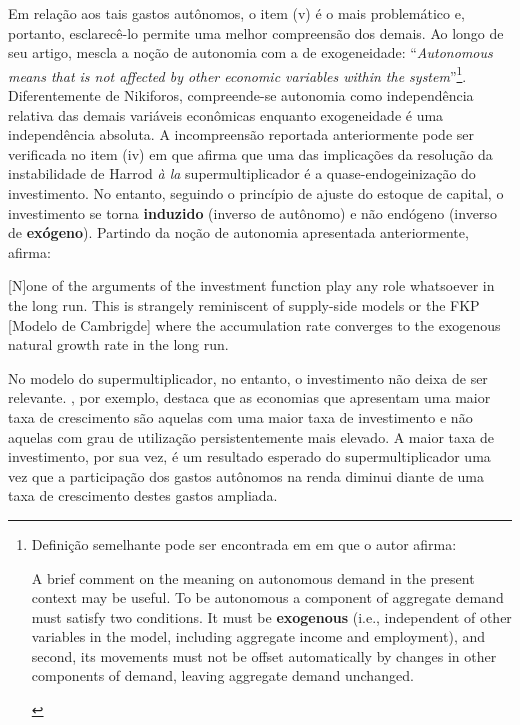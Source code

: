 Em relação aos tais gastos autônomos, o item (v) é o mais problemático e, portanto, esclarecê-lo permite uma melhor compreensão dos demais. Ao longo de seu artigo, \textcite[p.~4]{nikiforos_comments_2018} mescla a noção de autonomia com a de exogeneidade: ``\textit{Autonomous means that is not affected by other economic variables within the system}''\footnote{
	Definição semelhante pode ser encontrada em \textcite[p.~2, grifos adicionados]{skott_autonomous_2017} em que o autor afirma:
	\begin{citacao}
		A brief comment on the meaning on autonomous demand in the present context may be useful. To
		be autonomous a component of aggregate demand must satisfy two conditions. It must be \textbf{exogenous}
		(i.e., independent of other variables in the model, including aggregate income and employment), and
		second, its movements must not be offset automatically by changes in other components of demand,
		leaving aggregate demand unchanged.
	\end{citacao}	
}. Diferentemente de Nikiforos, compreende-se autonomia como independência relativa das demais variáveis econômicas enquanto exogeneidade é uma independência absoluta. 
A incompreensão reportada anteriormente pode ser verificada no item (iv) em que afirma que uma das implicações da resolução da instabilidade de Harrod \textit{à la} supermultiplicador é a quase-endogeinização do investimento. No entanto, seguindo o princípio de ajuste do estoque de capital, o investimento se torna \textbf{induzido} (inverso de autônomo) e não endógeno (inverso de \textbf{exógeno}). Partindo da noção de autonomia apresentada anteriormente, \citeauthor*{nikiforos_comments_2018} afirma:
\begin{citacao}
	
	[N]one of the arguments of the investment function play any role whatsoever in the long run. This is strangely
	reminiscent of supply-side models or the FKP [Modelo de Cambrigde] where the accumulation rate converges to the
	exogenous natural growth rate in the long run. \cite[p.~11--12, comentario adicionado]{nikiforos_comments_2018}
\end{citacao}
No modelo do supermultiplicador, no entanto, o investimento não deixa de ser relevante. \textcite{dejuan_hidden_2017}, por exemplo, destaca que as economias que apresentam uma maior taxa de crescimento são aquelas com uma maior taxa de investimento e não aquelas com grau de utilização persistentemente mais elevado. A maior taxa de investimento, por sua vez, é um resultado esperado do supermultiplicador uma vez que a participação dos gastos autônomos na renda diminui diante de uma taxa de crescimento destes gastos ampliada.

